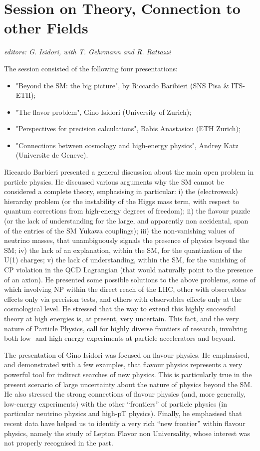 \section{Session on Theory, Connection to other Fields}\label{theory}{\it editors: G. Isidori, with T. Gehrmann and R. Rattazzi}

\noindent The session consisted of the following four presentations: 
\begin{itemize} \setlength{\itemsep}{-1ex}
\item "Beyond the SM: the big picture",  by  Riccardo Baribieri (SNS Pisa \& ITS-ETH); 
\item "The flavor problem", Gino Isidori (University of Zurich); 
\item "Perspectives for precision calculations",  Babis Anastasiou (ETH Zurich); 
\item  "Connections between cosmology and high-energy physics", Andrey Katz (Universite de Geneve).
\end{itemize}

\noindent Riccardo Barbieri presented a general discussion about the main open problem in particle physics. 
He  discussed various arguments why the SM cannot be considered a complete theory,
emphasising in particular:  i) the (electroweak) hierarchy problem (or the instability of the Higgs mass term,
with respect to quantum corrections from high-energy degrees of freedom); 
ii) the flavour puzzle (or the lack of understanding for the large, 
and apparently non accidental,  span of the entries of the SM Yukawa couplings); 
iii) the non-vanishing values of neutrino masses, that unambiguously 
signals the presence of physics beyond the SM;
iv)  the lack  of an explanation, within the SM, for the quantization of the U(1) charges; 
v) the lack of understanding, within the SM, for the vanishing of CP 
violation in the QCD Lagrangian (that would naturally point to the presence of an axion).
He presented some possible solutions to the above problems, some of which involving 
NP within the direct reach of the LHC, other with observables effects only via precision
tests, and others with observables effects only at the cosmological level. 
He stressed  that the way to extend this highly successful theory 
at high energies is, at present, very uncertain.  This fact, and the very nature of Particle Physics,
call for highly diverse frontiers of research, involving both low- and high-energy experiments
at particle accelerators and beyond.
\medskip

\noindent  The presentation of Gino Isidori was focused on flavour physics. He emphasised, and 
demonstrated with a few examples, that flavour physics represents
a very powerful tool for indirect searches of new physics. This is particularly true in the 
present scenario of large uncertainty about the nature of physics beyond the SM. 
He also stressed the strong connections of flavour physics (and, more generally, low-energy experiments) 
with the other ``frontiers'' of particle physics (in particular neutrino physics and high-pT physics).
Finally, he emphasised that recent data have helped us to identify a very rich ``new frontier''
within flavour physics, namely the study of Lepton Flavor non Universality, whose interest 
was not properly recognised in the past. 
\medskip

